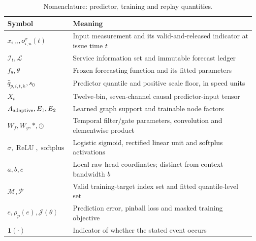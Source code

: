 \documentclass[pdflatex,sn-mathphys-num]{sn-jnl}
\begin{document}
\begin{table}[!htbp]
\caption{Nomenclature: predictor, training and replay quantities.}\label{tab:notation-training}
\centering\setlength{\tabcolsep}{3pt}\small
\begin{tabular}{>{\raggedright\arraybackslash}p{}>{\raggedright\arraybackslash}p{}}\toprule
Symbol & Meaning \\\midrule
$x_{i,u},o^x_{i,u}(t)$ & Input measurement and its valid-and-released indicator at issue time $t$ \\
$\mathcal I_t,\mathcal L$ & Service information set and immutable forecast ledger \\
$f_\theta,\theta$ & Frozen forecasting function and its fitted parameters \\
$\widehat q_{p,i,t,h},s_0$ & Predictor quantile and positive scale floor, in speed units \\
$X_t$ & Twelve-bin, seven-channel causal predictor-input tensor \\
$A_{\rm adaptive},E_1,E_2$ & Learned graph support and trainable node factors \\
$W_f,W_g,*,\odot$ & Temporal filter/gate parameters, convolution and elementwise product \\
$\sigma,\operatorname{ReLU},\operatorname{softplus}$ & Logistic sigmoid, rectified linear unit and softplus activations \\
$a,b,c$ & Local raw head coordinates; distinct from context-bandwidth $b$ \\
$\mathcal M,\mathcal P$ & Valid training-target index set and fitted quantile-level set \\
$e,\rho_p(e),\mathcal J(\theta)$ & Prediction error, pinball loss and masked training objective \\
$\mathbf1(\cdot)$ & Indicator of whether the stated event occurs \\
\bottomrule\end{tabular}
\end{table}
\FloatBarrier
\end{document}
